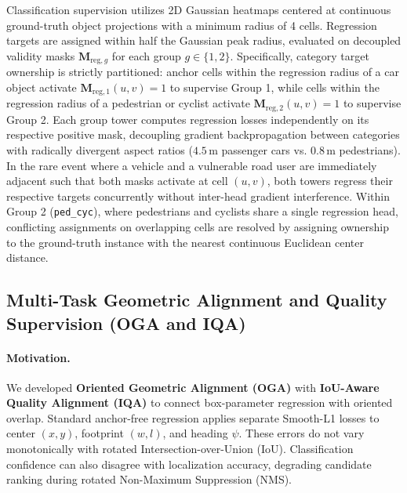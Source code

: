 Classification supervision utilizes 2D Gaussian heatmaps centered at continuous ground-truth object projections with a minimum radius of 4 cells. Regression targets are assigned within half the Gaussian peak radius, evaluated on decoupled validity masks $\mathbf{M}_{\mathrm{reg}, g}$ for each group $g \in \{1, 2\}$. Specifically, category target ownership is strictly partitioned: anchor cells within the regression radius of a car object activate $\mathbf{M}_{\mathrm{reg}, 1}(u, v) = 1$ to supervise Group 1, while cells within the regression radius of a pedestrian or cyclist activate $\mathbf{M}_{\mathrm{reg}, 2}(u, v) = 1$ to supervise Group 2. Each group tower computes regression losses independently on its respective positive mask, decoupling gradient backpropagation between categories with radically divergent aspect ratios ($4.5$\,m passenger cars vs. $0.8$\,m pedestrians). In the rare event where a vehicle and a vulnerable road user are immediately adjacent such that both masks activate at cell $(u, v)$, both towers regress their respective targets concurrently without inter-head gradient interference. Within Group 2 (\texttt{ped\_cyc}), where pedestrians and cyclists share a single regression head, conflicting assignments on overlapping cells are resolved by assigning ownership to the ground-truth instance with the nearest continuous Euclidean center distance.

\subsection{Multi-Task Geometric Alignment and Quality Supervision (OGA and IQA)}
\label{sec:losses_and_oga}

\paragraph{Motivation.}
We developed \textbf{Oriented Geometric Alignment (OGA)} with \textbf{IoU-Aware Quality Alignment (IQA)} to connect box-parameter regression with oriented overlap. Standard anchor-free regression applies separate Smooth-L1 losses to center $(x, y)$, footprint $(w, l)$, and heading $\psi$. These errors do not vary monotonically with rotated Intersection-over-Union (IoU). Classification confidence can also disagree with localization accuracy, degrading candidate ranking during rotated Non-Maximum Suppression (NMS).

